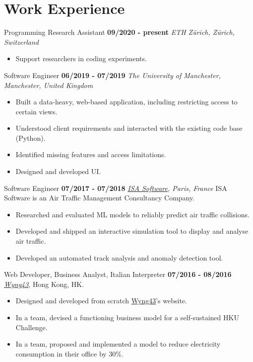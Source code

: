 \documentclass[]{friggeri-cv}
\begin{document}
\section{\color{red}Work \color{gray} Experience}
\begin{entrylist}
  \entry
    {}
    {Programming Research Assistant}
    {\textbf{09/2020 - present}}
    {\emph{{ETH Zürich}, Zürich, Switzerland}}
    \begin{itemize}[topsep=0pt]
        \item Support researchers in coding experiments.
    \end{itemize}
    
\end{entrylist}
\begin{entrylist}
  \entry
    {}
    {Software Engineer}
    {\textbf{06/2019 - 07/2019}}
    {\emph{{The University of Manchester}, Manchester, United Kingdom}}
    \begin{itemize}[topsep=0pt]
        \item Built a data-heavy, web-based application, including restricting access to certain views.
        \item Understood client requirements and interacted with the existing code base (Python).
        \item Identified missing features and access limitations.
        \item Designed and developed UI.
    \end{itemize}
    
\end{entrylist}
\begin{entrylist}
  \entry
    {}
    {Software Engineer}
    {\textbf{07/2017 - 07/2018}}
    {\emph{\href{https://www.isa-software.com}{ISA Software}, Paris, France}}
    ISA Software is an Air Traffic Management Consultancy Company.
    \begin{itemize}[topsep=0pt]
        \item Researched and evaluated ML models to reliably predict air traffic collisions.
        \item Developed and shipped an interactive simulation tool to display and analyse air traffic.
        \item Developed an automated track analysis and anomaly detection tool.
    \end{itemize}
    
\end{entrylist}
\begin{entrylist}
  \entry
    {}
    {Web Developer, Business Analyst, Italian Interpreter}
    {\textbf{07/2016 - 08/2016}}
    {\emph{\href{http://www.wyng43.com/}{Wyng43}}, Hong Kong, HK}.
    \begin{itemize}
        \item Designed and developed from scratch \href{http://www.wyng43.com/}{Wyng43}'s website.
        \item In a team, devised a functioning business model for a self-sustained HKU Challenge.
        \item In a team, proposed and implemented a model to reduce electricity consumption in their office by 30\%.
    \end{itemize}
\end{entrylist}
\end{document}
